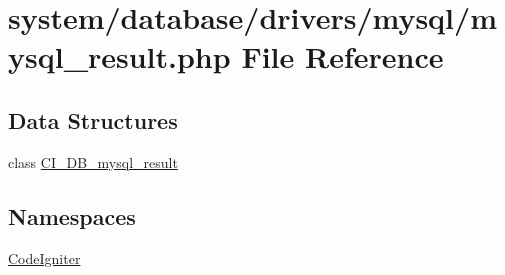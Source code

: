 \hypertarget{mysql__result_8php}{}\section{system/database/drivers/mysql/mysql\+\_\+result.php File Reference}
\label{mysql__result_8php}
\subsection*{Data Structures}
\begin{DoxyCompactItemize}
\item 
class \mbox{\hyperlink{class_c_i___d_b__mysql__result}{C\+I\+\_\+\+D\+B\+\_\+mysql\+\_\+result}}
\end{DoxyCompactItemize}
\subsection*{Namespaces}
\begin{DoxyCompactItemize}
\item 
 \mbox{\hyperlink{namespace_code_igniter}{Code\+Igniter}}
\end{DoxyCompactItemize}
